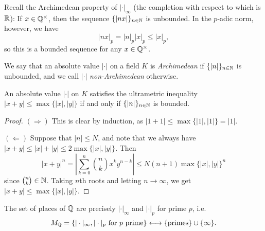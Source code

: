 \begin{remark}
  Recall the Archimedean property of $|\cdot|_{\infty}$
  (the completion with respect to which is $\mathbb{R}$):
  If $x \in \mathbb{Q}^\times$, then the sequence
  $\{|nx|\}_{n \in \mathbb{N}}$
  is unbounded. In the $p$-adic norm, however, we have
  \[
    |nx|_{p} = |n|_p |x|_p \le |x|_p,
  \]
  so this is a bounded sequence for any $x \in \mathbb{Q}^\times$.
\end{remark}

\begin{definition}
  We say that an absolute value $|\cdot|$ on a field
  $K$ is \emph{Archimedean} if $\{|n|\}_{n \in \mathbb{N}}$
  is unbounded, and we call $|\cdot|$ \emph{non-Archimedean}
  otherwise.
\end{definition}

\begin{lemma}
  An absolute value $|\cdot|$ on $K$ satisfies the
  ultrametric inequality $|x + y| \le \max\{|x|, |y|\}$
  if and only if $\{|n|\}_{n \in \mathbb{N}}$ is bounded.
\end{lemma}

\begin{proof}
  $(\Rightarrow)$ This is clear by induction, as
  $|1 + 1| \le \max\{|1|, |1|\} = |1|$.

  $(\Leftarrow)$ Suppose that $|n| \le N$, and
  note that we always have
  $|x + y| \le |x| + |y| \le 2 \max\{|x|, |y|\}$. Then
  \[
    |x + y|^n
    = \left|\sum_{k = 0}^n \binom{n}{k} x^k y^{n - k}\right|
    \le N (n + 1) \max\{|x|, |y|\}^n
  \]
  since $\binom{n}{k} \in \mathbb{N}$.
  Taking $n$th roots and letting $n \to \infty$, we
  get $|x + y| \le \max\{|x|, |y|\}$.
\end{proof}

\begin{theorem}[Ostrowski]
  The set of places of $\mathbb{Q}$ are precisely
  $|\cdot|_{\infty}$ and $|\cdot|_p$ for prime $p$, i.e.
  \[
    M_{\mathbb{Q}}
    = \{|\cdot|_{\infty}, |\cdot|_{p} \text{ for $p$ prime}\}
    \longleftrightarrow \{\mathrm{primes}\} \cup \{\infty\}.
  \]
\end{theorem}

